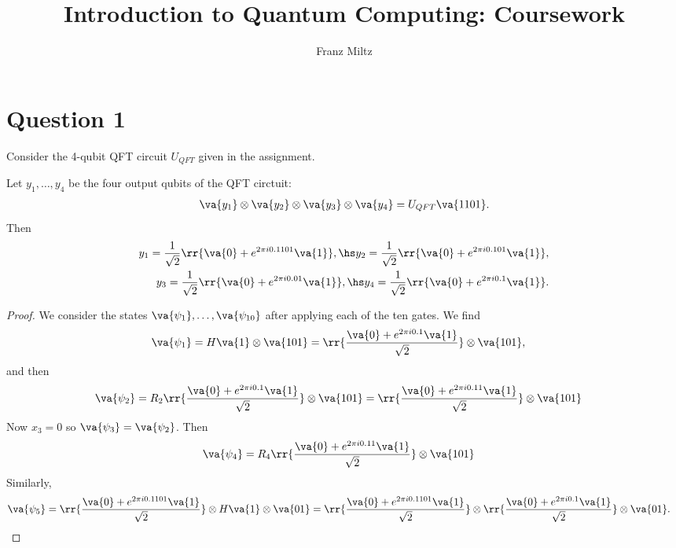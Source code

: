 \documentclass{article}
\title{Introduction to Quantum Computing: Coursework}
\author{Franz Miltz}
\begin{document}
\maketitle

\section*{Question 1}

Consider the 4-qubit QFT circuit $U_{QFT}$ given in the assignment.

\begin{claim*}[a]
  Let $y_1,\ldots,y_4$ be the four output qubits of the QFT circtuit:
  \begin{align*}
    \va{y_1}\otimes \va{y_2}\otimes \va{y_3}\otimes\va{y_4}=U_{QFT}\va{1101}.
  \end{align*}
  Then
  \begin{align*}
    y_1 = \frac{1}{\sqrt{2}} \rr{\va{0}+e^{2\pi i 0.1101}\va{1}},\hs
    y_2 = \frac{1}{\sqrt{2}} \rr{\va{0}+e^{2\pi i 0.101}\va{1}},\\
    y_3 = \frac{1}{\sqrt{2}} \rr{\va{0}+e^{2\pi i 0.01}\va{1}},\hs
    y_4 = \frac{1}{\sqrt{2}} \rr{\va{0}+e^{2\pi i 0.1}\va{1}}.
  \end{align*}
  \begin{proof}
    We consider the states $\va{\psi_1},\ldots,\va{\psi_{10}}$ after applying each
    of the ten gates.
    We find
    \begin{align*}
      \va{\psi_1}&=H\va{1}\otimes \va{101} = \rr{\frac{\va{0}+e^{2\pi i 0.1}\va{1}}{\sqrt{2}}}\otimes\va{101},
    \end{align*}
    and then
    \begin{align*}
      \va{\psi_2}
      &=R_2\rr{\frac{\va{0}+e^{2\pi i 0.1}\va{1}}{\sqrt{2}}}\otimes\va{101}
      =\rr{\frac{\va{0}+e^{2\pi i 0.11}\va{1}}{\sqrt{2}}}\otimes\va{101}
    \end{align*}
    Now $x_3=0$ so $\va{\psi_3}=\va{\psi_2}$. Then
    \begin{align*}
      \va{\psi_4}
      &=R_4\rr{\frac{\va{0}+e^{2\pi i 0.11}\va{1}}{\sqrt{2}}}\otimes\va{101}
    \end{align*}
    Similarly,
    \begin{align*}
      \va{\psi_5}
      &=\rr{\frac{\va{0}+e^{2\pi i 0.1101}\va{1}}{\sqrt{2}}}
      \otimes H\va{1}
      \otimes \va{01}
      =\rr{\frac{\va{0}+e^{2\pi i 0.1101}\va{1}}{\sqrt{2}}}
      \otimes \rr{\frac{\va{0}+e^{2\pi i 0.1}\va{1}}{\sqrt{2}}}
      \otimes \va{01}.
    \end{align*}

\end{proof}
\end{claim*}
\end{document}
